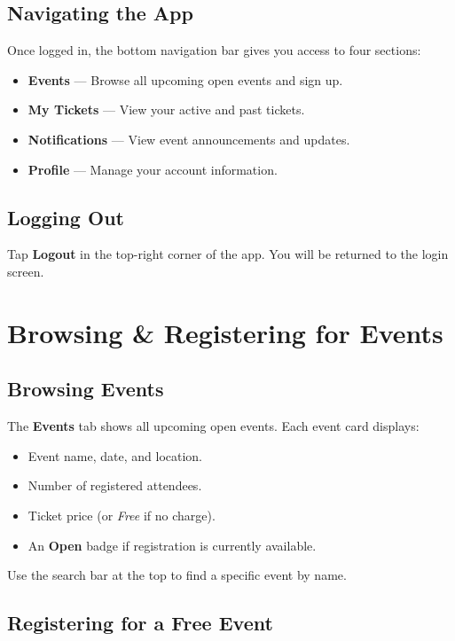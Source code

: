 \documentclass[12pt, twoside]{report}
\newcommand{\uielem}[1]{\textbf{#1}}
\begin{document}
\section{Navigating the App}

Once logged in, the bottom navigation bar gives you access to four sections:

\begin{itemize}
  \item \uielem{Events} --- Browse all upcoming open events and sign up.
  \item \uielem{My Tickets} --- View your active and past tickets.
  \item \uielem{Notifications} --- View event announcements and updates.
  \item \uielem{Profile} --- Manage your account information.
\end{itemize}

\section{Logging Out}

Tap \uielem{Logout} in the top-right corner of the app. You will be returned
to the login screen.


\chapter{Browsing \& Registering for Events}

\section{Browsing Events}

The \uielem{Events} tab shows all upcoming open events. Each event card displays:
\begin{itemize}
  \item Event name, date, and location.
  \item Number of registered attendees.
  \item Ticket price (or \textit{Free} if no charge).
  \item An \textbf{Open} badge if registration is currently available.
\end{itemize}

Use the search bar at the top to find a specific event by name.

\section{Registering for a Free Event}
\end{document}
